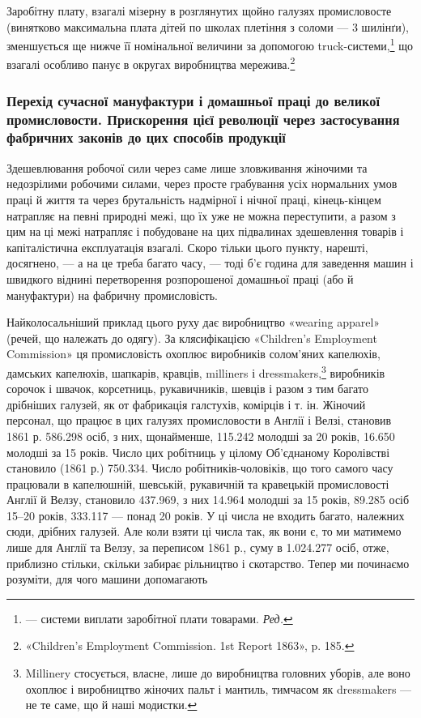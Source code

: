 Заробітну плату, взагалі мізерну в розглянутих щойно галузях
промисловосте (винятково максимальна плата дітей по школах
плетіння з соломи — 3 шилінґи), зменшується ще нижче її номінальної
величини за допомогою truck-системи,\footnote*{
— системи виплати заробітної плати товарами. \emph{Ред.}
} що взагалі особливо панує в округах виробництва мережива.\footnote{
«Children’s Employment Commission. 1st Report 1863», p. 185.
}

\subsubsection{Перехід сучасної мануфактури і домашньої
праці до великої промисловости. Прискорення
цієї революції через застосування фабричних
законів до цих способів продукції}

Здешевлювання робочої сили через саме лише зловживання
жіночими та недозрілими робочими силами, через просте грабування
усіх нормальних умов праці й життя та через брутальність
надмірної і нічної праці, кінець-кінцем натрапляє на певні природні
межі, що їх уже не можна переступити, а разом з цим
на ці межі натрапляє і побудоване на цих підвалинах здешевлення
товарів і капіталістична експлуатація взагалі. Скоро тільки цього
пункту, нарешті, досягнено, — а на це треба багато часу, — тоді
б’є година для заведення машин і швидкого віднині перетворення
розпорошеної домашньої праці (або й мануфактури) на фабричну
промисловість.

Найколосальніший приклад цього руху дає виробництво «wearing
apparel» (речей, що належать до одягу). За клясифікацією
«Children’s Employment Commission» ця промисловість охоплює
виробників солом’яних капелюхів, дамських капелюхів, шапкарів,
кравців, milliners і dressmakers,\footnote{
Millinery стосується, власне, лише до виробництва головних уборів,
але воно охоплює і виробництво жіночих пальт і мантиль, тимчасом
як dressmakers — не те саме, що й наші модистки.
} виробників сорочок і швачок,
корсетниць, рукавичників, шевців і разом з тим багато дрібніших
галузей, як от фабрикація галстухів, комірців і т. ін. Жіночий
персонал, що працює в цих галузях промисловости в Англії і
Велзі, становив 1861 р. \num{586.298} осіб, з них, щонайменше, \num{115.242}
молодші за 20 років, \num{16.650} молодші за 15 років. Число цих робітниць
у цілому Об’єднаному Королівстві становило (1861 р.)
\num{750.334}. Число робітників-чоловіків, що того самого часу працювали
в капелюшній, шевській, рукавичній та кравецькій промисловості
Англії й Велзу, становило \num{437.969}, з них \num{14.964} молодші
за 15 років, \num{89.285} осіб 15--20 років, \num{333.117} — понад 20 років.
У ці числа не входить багато, належних сюди, дрібних галузей.
Але коли взяти ці числа так, як вони є, то ми матимемо лише для
Англії та Велзу, за переписом 1861 р., суму в \num{1.024.277} осіб,
отже, приблизно стільки, скільки забирає рільництво і скотарство.
Тепер ми починаємо розуміти, для чого машини допомагають
\parbreak{}  %
